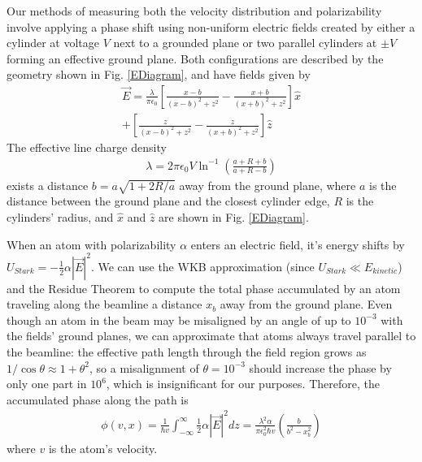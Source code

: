 \documentclass[twocolumn,prl,showpacs,superscriptaddress]{revtex4-1}   %
\newcommand{\abs}[1]{\left|#1\right|}
\newcommand{\figref}[1]{Fig. \ref{#1}}
\begin{document}
Our methods of measuring both the velocity distribution and polarizability involve applying a phase shift using non-uniform electric fields created by either a cylinder at voltage $V$ next to a grounded plane or two parallel cylinders at $\pm V$ forming an effective ground plane. 
Both configurations are described by the geometry shown in \figref{EDiagram}, and have fields given by
\begin{align}
	\vec{E} = \frac{\lambda}{\pi\epsilon_0}
	\left[	
		\frac{x-b}{(x-b)^2+z^2} - \frac{x+b}{(x+b)^2+z^2}
	\right] \hat{x} \nonumber \\
	+ 
	\left[	
		\frac{z}{(x-b)^2+z^2} - \frac{z}{(x+b)^2+z^2}
	\right] \hat{z}
	\label{EPillars}
\end{align}
The effective line charge density
\begin{align}
	\lambda = 2\pi\epsilon_0V\ln^{-1}
	\left(
		\frac{a+R+b}{a+R-b}
	\right)
	\label{lambda}
\end{align}
exists a distance $b = a\sqrt{1+2R/a}$ away from the ground plane, where $a$ is the distance between the ground plane and the closest cylinder edge, $R$ is the cylinders' radius, and $\hat{x}$ and $\hat{z}$ are shown in \figref{EDiagram}.

When an atom with polarizability $\alpha$ enters an electric field, it's energy shifts by $U_{Stark} = -\frac{1}{2}\alpha\abs{\vec{E}}^2$. We can use the WKB approximation (since $U_{Stark} \ll E_{kinetic}$) and the Residue Theorem to compute the total phase accumulated by an atom traveling along the beamline a distance $x_b$ away from the ground plane. Even though an atom in the beam may be misaligned by an angle of up to $10^{-3}$ with the fields' ground planes, we can approximate that atoms always travel parallel to the beamline: the effective path length through the field region grows as $1/\cos{\theta} \approx 1+\theta^2$, so a misalignment of $\theta = 10^{-3}$ should increase the phase by only one part in $10^6$, which is insignificant for our purposes. Therefore, the accumulated phase along the path is
\begin{align}
	\phi(v,x) = 
	\frac{1}{\hbar v} \int_{-\infty}^{\infty} \frac{1}{2} \alpha |\vec{E}|^2 dz =	
	\frac{\lambda^2 \alpha}{\pi \epsilon_0^2 \hbar v}
	\left( \frac{b}{b^2-x_b^2} \right)
	\label{accumPhasePillars}
\end{align}
where $v$ is the atom's velocity.
\end{document}
